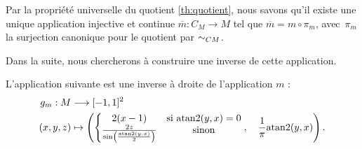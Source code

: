 \documentclass[hidelinks, 10pt]{article}
\begin{document}
Par la propriété universelle du quotient \ref{th:quotient}, nous savons qu'il existe une unique application injective et continue $\overline{m}:C_M\to M$ tel que $\overline{m}=m\circ\pi_m$, avec~$\pi_m$ la surjection canonique pour le quotient par $\sim_{CM}$. 

Dans la suite, nous chercherons à construire une inverse de cette application.

\begin{proposition}\label{prop:reciproque-mobius}
L'application suivante est une inverse à droite de l'application $m$ : \[\begin{split}
g_m:M&\longrightarrow [-1,1]^2\\
(x,y,z)&\mapsto\left ( \left\{\begin{matrix}
2(x-1) &\text{si }\mathrm{atan}2(y,x)=0 \\ 
\frac{2z}{\sin\left(\frac{\mathrm{atan}2(y,x)}{2}\right)} & \text{sinon}
\end{matrix}\right.,\quad\frac{1}{\pi} \mathrm{atan}2(y,x) \right ).
\end{split}\]
\end{proposition}
\end{document}
